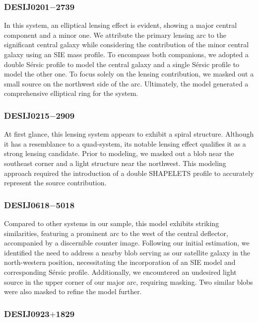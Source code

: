 \documentclass{aa}
\begin{document}
\subsubsection{DESIJ0201$-$2739} \label{model:2739}

In this system, an elliptical lensing effect is evident, showing a major central component and a minor one. We attribute the primary lensing arc to the significant central galaxy while considering the contribution of the minor central galaxy using an SIE mass profile. To encompass both companions, we adopted a double S\'ersic  profile to model the central galaxy and a single S\'ersic  profile to model the other one. To focus solely on the lensing contribution, we masked out a small source on the northwest side of the arc. Ultimately, the model generated a comprehensive elliptical ring for the system.

\subsubsection{DESIJ0215$-$2909}

At first glance, this lensing system appears to exhibit a spiral structure. Although it has a resemblance to a quad-system, its notable lensing effect qualifies it as a strong lensing candidate. Prior to modeling, we masked out a blob near the southeast corner and a light structure near the northwest. This modeling approach required the introduction of a double SHAPELETS profile to accurately represent the source contribution.

\subsubsection{DESIJ0618$-$5018}
Compared to other systems in our sample, this model exhibits striking similarities, featuring a prominent arc to the west of the central deflector, accompanied by a discernible counter image. Following our initial estimation, we identified the need to address a nearby blob serving as our satellite galaxy in the north-western position, necessitating the incorporation of an SIE model and corresponding S\'ersic profile. Additionally, we encountered an undesired light source in the upper corner of our major arc, requiring masking. Two similar blobs were also masked to refine the model further.


\subsubsection{DESIJ0923$+$1829}
\end{document}
